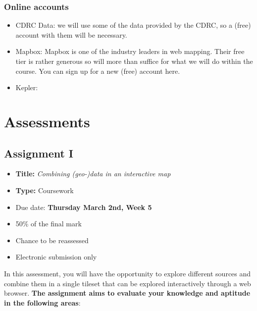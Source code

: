\documentclass[
  letterpaper,
  DIV=11,
  numbers=noendperiod]{scrreprt}
\providecommand{\tightlist}{%
  \setlength{\itemsep}{0pt}\setlength{\parskip}{0pt}}\usepackage{longtable,booktabs,array}
\begin{document}
\hypertarget{online-accounts}{%
\subsection*{Online accounts}\label{online-accounts}}

\begin{itemize}
\item
  CDRC Data: we will use some of the data provided by the CDRC, so a
  (free) account with them will be necessary.
\item
  Mapbox: Mapbox is one of the industry leaders in web mapping. Their
  free tier is rather generous so will more than suffice for what we
  will do within the course. You can sign up for a new (free) account
  here.
\item
  Kepler:
\end{itemize}


\hypertarget{assessments}{%
\chapter*{Assessments}\label{assessments}}


\hypertarget{assignment-i-1}{%
\section*{Assignment I}\label{assignment-i-1}}


\begin{itemize}
\tightlist
\item
  \textbf{Title:} \emph{Combining (geo-)data in an interactive map}
\item
  \textbf{Type:} Coursework
\item
  Due date: \textbf{Thursday March 2nd, Week 5}
\item
  50\% of the final mark
\item
  Chance to be reassessed
\item
  Electronic submission only
\end{itemize}

In this assessment, you will have the opportunity to explore different
sources and combine them in a single tileset that can be explored
interactively through a web browser. \textbf{The assignment aims to
evaluate your knowledge and aptitude in the following areas}:
\end{document}
